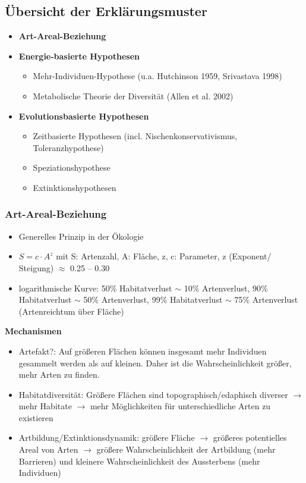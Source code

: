 \newpage
\subsection{Übersicht der Erklärungsmuster}
\begin{itemize}
	\item \textbf{Art-Areal-Beziehung}
	\item \textbf{Energie-basierte Hypothesen}
	\begin{itemize}
		\item Mehr-Individuen-Hypothese (u.a. Hutchinson 1959, Srivastava 1998)
		\item Metabolische Theorie der Diversität (Allen et al. 2002)
	\end{itemize}
	\item \textbf{Evolutionsbasierte Hypothesen}
	\begin{itemize}
		\item Zeitbasierte Hypothesen (incl. Nischenkonservativismus, Toleranzhypothese)
		\item Speziationshypothese
		\item Extinktionshypothesen
	\end{itemize}
\end{itemize}

\subsubsection{Art-Areal-Beziehung}
\begin{itemize}
	\item Generelles Prinzip in der Ökologie
	\item $S=c \cdot A^z$ mit S: Artenzahl, A: Fläche, z, c: Parameter, z (Exponent/ Steigung) $\approx$ 0.25 – 0.30
	\item logarithmische Kurve: 50\% Habitatverlust $\sim$ 10\% Artenverlust, 90\% Habitatverlust $\sim$ 50\% Artenverlust, 99\% Habitatverlust $\sim$ 75\% Artenverlust (Artenreichtum über Fläche)
\end{itemize}

\textbf{Mechanismen}
\begin{itemize}
	\item Artefakt?: Auf größeren Flächen können insgesamt mehr Individuen gesammelt werden als auf kleinen. Daher ist die Wahrscheinlichkeit größer, mehr Arten zu finden.
	\item Habitatdiversität: Größere Flächen sind topographisch/edaphisch diverser $\rightarrow$ mehr Habitate $\rightarrow$ mehr Möglichkeiten für unterschiedliche Arten zu existieren
	\item Artbildung/Extinktionsdynamik: größere Fläche $\rightarrow$ größeres potentielles Areal von Arten $\rightarrow$ größere Wahrscheinlichkeit der Artbildung (mehr Barrieren) und kleinere Wahrscheinlichkeit des Aussterbens (mehr Individuen)
\end{itemize}

